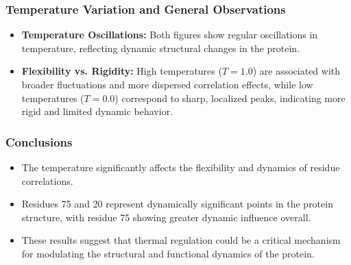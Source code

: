 \documentclass[English, Lau, oneside]{sapthesis}
\begin{document}
\subsubsection{Temperature Variation and General Observations}
\begin{itemize}
    \item \textbf{Temperature Oscillations:} Both figures show regular oscillations in temperature, reflecting dynamic structural changes in the protein.
    \item \textbf{Flexibility vs. Rigidity:} High temperatures (\( T = 1.0 \)) are associated with broader fluctuations and more dispersed correlation effects, while low temperatures (\( T = 0.0 \)) correspond to sharp, localized peaks, indicating more rigid and limited dynamic behavior.
\end{itemize}

\subsubsection{Conclusions}
\begin{itemize}
    \item The temperature significantly affects the flexibility and dynamics of residue correlations.
    \item Residues 75 and 20 represent dynamically significant points in the protein structure, with residue 75 showing greater dynamic influence overall.
    \item These results suggest that thermal regulation could be a critical mechanism for modulating the structural and functional dynamics of the protein.
\end{itemize}









\newpage
\newpage
\end{document}
